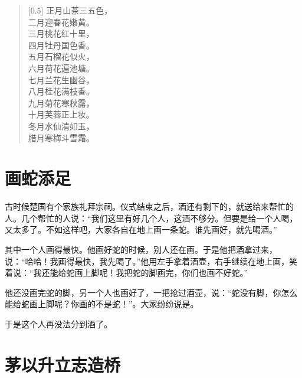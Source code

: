 \documentclass[12pt,UTF-8,openany]{ctexbook}
\begin{document}
\begin{large}
    
    \begin{verse}[0.5\linewidth]
        正月山茶三五色， \\
        二月迎春花嫩黄。 \\
        三月桃花红十里， \\
        四月牡丹国色香。 \\
        五月石榴花似火， \\
        六月荷花遍池塘。 \\
        七月兰花生幽谷， \\
        八月桂花满枝香。 \\
        九月菊花寒秋露， \\
        十月芙蓉正上妆。 \\
        冬月水仙清如玉， \\
        腊月寒梅斗雪霜。
    \end{verse}
    
\end{large}



\chapter{画蛇添足}

\begin{large}
    
    古时候楚国有个家族礼拜宗祠。仪式结束之后，酒还有剩下的，就送给来帮忙的人。几个帮忙的人说：“我们这里有好几个人，这酒不够分。但要是给一个人喝，又太多了。不如这样吧，大家各自在地上画一条蛇。谁先画好，就先喝酒。”
    
    其中一个人画得最快。他画好蛇的时候，别人还在画。于是他把酒拿过来，说：“哈哈！我画得最快，我先喝了。”他用左手拿着酒壶，右手继续在地上画，笑着说：“我还能给蛇画上脚呢！我把蛇的脚画完，你们也画不好蛇。”
    
    他还没画完蛇的脚，另一个人也画好了，一把抢过酒壶，说：“蛇没有脚，你怎么能给蛇画上脚呢？你画的不是蛇！”。大家纷纷说是。
    
    于是这个人再没法分到酒了。
    
\end{large}



\chapter{茅以升立志造桥}
\end{document}
